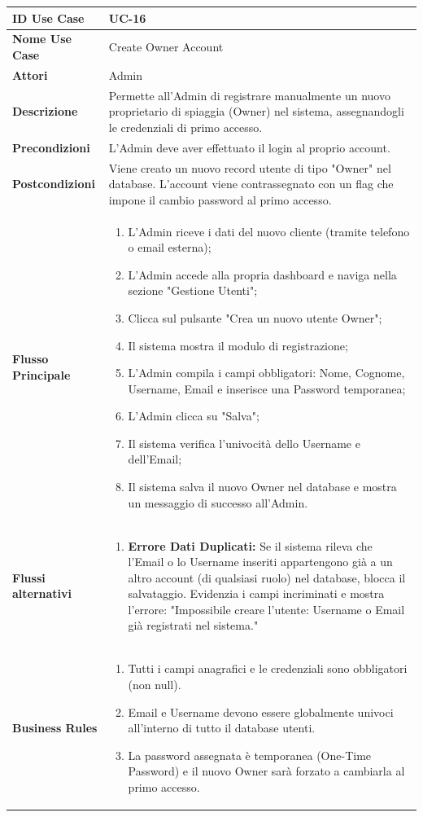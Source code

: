 \documentclass{article}
\newcommand{\usecasetable}[9]{
	\begin{table}[h!]
		\centering
		\footnotesize
		\renewcommand{\arraystretch}{1.4}
		\begin{tabularx}{\textwidth}{|l|>{\raggedright\arraybackslash}X|}
			\hline
			\textbf{ID Use Case} & #1 \\ \hline
			\textbf{Nome Use Case} & #2 \\ \hline
			\textbf{Attori} & #3 \\ \hline
			\textbf{Descrizione} & #4 \\ \hline
			\textbf{Precondizioni} & #5 \\ \hline
			\textbf{Postcondizioni} & #6 \\ \hline
			\textbf{Flusso Principale} & #7 \\ \hline
			\textbf{Flussi alternativi} & #8 \\ \hline
			\textbf{Business Rules} & #9 \\ \hline
		\end{tabularx}
	\end{table}
}
\begin{document}
	\newpage
	
	\usecasetable
	{UC-16}
	{Create Owner Account}
	{Admin}
	{Permette all'Admin di registrare manualmente un nuovo proprietario di spiaggia (Owner) nel sistema, assegnandogli le credenziali di primo accesso.}
	{L'Admin deve aver effettuato il login al proprio account.}
	{Viene creato un nuovo record utente di tipo "Owner" nel database. L'account viene contrassegnato con un flag che impone il cambio password al primo accesso.}
	{
		\begin{enumerate}[nosep, leftmargin=*]
			\item L'Admin riceve i dati del nuovo cliente (tramite telefono o email esterna);
			\item L'Admin accede alla propria dashboard e naviga nella sezione "Gestione Utenti";
			\item Clicca sul pulsante "Crea un nuovo utente Owner";
			\item Il sistema mostra il modulo di registrazione;
			\item L'Admin compila i campi obbligatori: Nome, Cognome, Username, Email e inserisce una Password temporanea;
			\item L'Admin clicca su "Salva";
			\item Il sistema verifica l'univocità dello Username e dell'Email;
			\item Il sistema salva il nuovo Owner nel database e mostra un messaggio di successo all'Admin.
		\end{enumerate}
	}
	{
		\begin{enumerate}[nosep, leftmargin=25px]
			\item[\textbf{7a-e.}] \textbf{Errore Dati Duplicati:} Se il sistema rileva che l'Email o lo Username inseriti appartengono già a un altro account (di qualsiasi ruolo) nel database, blocca il salvataggio. Evidenzia i campi incriminati e mostra l'errore: "Impossibile creare l'utente: Username o Email già registrati nel sistema."
		\end{enumerate}
	}
	{
		\begin{enumerate}[nosep, leftmargin=*]
			\item[•] Tutti i campi anagrafici e le credenziali sono obbligatori (non null).
			\item[•] Email e Username devono essere globalmente univoci all'interno di tutto il database utenti.
			\item[•] La password assegnata è temporanea (One-Time Password) e il nuovo Owner sarà forzato a cambiarla al primo accesso.
		\end{enumerate}
	}
		
\end{document}

